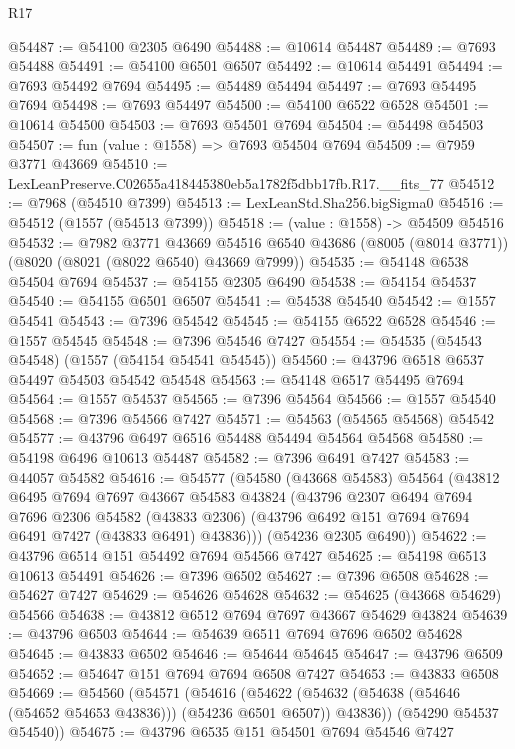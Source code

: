 \begin{lexlean}{R17}
\begin{coremodule}
@54487 := @54100 @2305 @6490
@54488 := @10614 @54487
@54489 := @7693 @54488
@54491 := @54100 @6501 @6507
@54492 := @10614 @54491
@54494 := @7693 @54492 @7694
@54495 := @54489 @54494
@54497 := @7693 @54495 @7694
@54498 := @7693 @54497
@54500 := @54100 @6522 @6528
@54501 := @10614 @54500
@54503 := @7693 @54501 @7694
@54504 := @54498 @54503
@54507 := fun (value : @1558) => @7693 @54504 @7694
@54509 := @7959 @3771 @43669
@54510 := LexLeanPreserve.C02655a418445380eb5a1782f5dbb17fb.R17.__fits_77
@54512 := @7968 (@54510 @7399)
@54513 := LexLeanStd.Sha256.bigSigma0
@54516 := @54512 (@1557 (@54513 @7399))
@54518 := (value : @1558) -> @54509 @54516
@54532 := @7982
    @3771
    @43669
    @54516
    @6540
    @43686
    (@8005 (@8014 @3771))
    (@8020 (@8021 (@8022 @6540) @43669 @7999))
@54535 := @54148 @6538 @54504 @7694
@54537 := @54155 @2305 @6490
@54538 := @54154 @54537
@54540 := @54155 @6501 @6507
@54541 := @54538 @54540
@54542 := @1557 @54541
@54543 := @7396 @54542
@54545 := @54155 @6522 @6528
@54546 := @1557 @54545
@54548 := @7396 @54546 @7427
@54554 := @54535 (@54543 @54548) (@1557 (@54154 @54541 @54545))
@54560 := @43796 @6518 @6537 @54497 @54503 @54542 @54548
@54563 := @54148 @6517 @54495 @7694
@54564 := @1557 @54537
@54565 := @7396 @54564
@54566 := @1557 @54540
@54568 := @7396 @54566 @7427
@54571 := @54563 (@54565 @54568) @54542
@54577 := @43796 @6497 @6516 @54488 @54494 @54564 @54568
@54580 := @54198 @6496 @10613 @54487
@54582 := @7396 @6491 @7427
@54583 := @44057 @54582
@54616 := @54577
    (@54580
      (@43668 @54583)
      @54564
      (@43812
        @6495
        @7694
        @7697
        @43667
        @54583
        @43824
        (@43796
          @2307
          @6494
          @7694
          @7696
          @2306
          @54582
          (@43833 @2306)
          (@43796 @6492 @151 @7694 @7694 @6491 @7427 (@43833 @6491) @43836)))
      (@54236 @2305 @6490))
@54622 := @43796 @6514 @151 @54492 @7694 @54566 @7427
@54625 := @54198 @6513 @10613 @54491
@54626 := @7396 @6502
@54627 := @7396 @6508
@54628 := @54627 @7427
@54629 := @54626 @54628
@54632 := @54625 (@43668 @54629) @54566
@54638 := @43812 @6512 @7694 @7697 @43667 @54629 @43824
@54639 := @43796 @6503
@54644 := @54639 @6511 @7694 @7696 @6502 @54628
@54645 := @43833 @6502
@54646 := @54644 @54645
@54647 := @43796 @6509
@54652 := @54647 @151 @7694 @7694 @6508 @7427
@54653 := @43833 @6508
@54669 := @54560
    (@54571
      (@54616
        (@54622 (@54632 (@54638 (@54646 (@54652 @54653 @43836))) (@54236 @6501 @6507)) @43836))
      (@54290 @54537 @54540))
@54675 := @43796 @6535 @151 @54501 @7694 @54546 @7427

\end{coremodule}
\end{lexlean}
